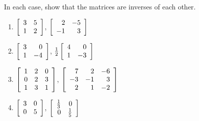 \begin{multicols}{2}
\begin{ex}
In each case, show that the matrices are inverses of each other.

\begin{enumerate}[label={\alph*.}]
\item $\left[ \begin{array}{rr}
3 & 5 \\
1 & 2
\end{array} \right]$, $\left[ \begin{array}{rr}
2 & -5 \\
-1 & 3
\end{array} \right]$

\item $\left[ \begin{array}{rr}
3 & 0 \\
1 & -4
\end{array} \right]$, $\tfrac{1}{2}\left[ \begin{array}{rr}
4 & 0 \\
1 & -3
\end{array} \right]$

\item $\left[ \begin{array}{rrr}
1 & 2 & 0 \\
0 & 2 & 3 \\
1 & 3 & 1
\end{array} \right]$, $\left[ \begin{array}{rrr}
7 & 2 & -6 \\
-3 & -1 & 3 \\
2 & 1 & -2
\end{array} \right]$

\item $\left[ \begin{array}{rr}
3 & 0 \\
0 & 5
\end{array} \right]$, $\left[ \begin{array}{rr}
\tfrac{1}{3} & 0 \\
0 & \tfrac{1}{5}
\end{array} \right]$


\end{enumerate}
\end{ex}


\end{multicols}

